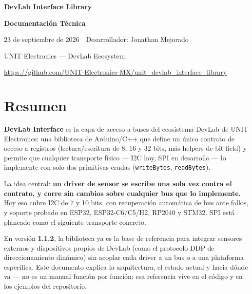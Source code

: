 \documentclass[11pt,a4paper]{article}
\newcommand{\code}[1]{\texttt{\small #1}}
\begin{document}
\begin{titlepage}
    \centering
    \vspace*{5cm}
    {\Huge\bfseries DevLab Interface Library\par}
    \vspace{0.5em}
    {\Large\bfseries Documentación Técnica\par}
    \vspace{2em}
    {\large 23 de septiembre de 2026 \,\textperiodcentered\, Desarrollador: Jonathan Mejorado\par}
    \vfill
    {\normalsize UNIT Electronics --- DevLab Ecosystem\par}
    \vspace{0.6em}
    {\normalsize \url{https://github.com/UNIT-Electronics-MX/unit_devlab_interface_library}\par}
    \vspace{2cm}
\end{titlepage}


\section*{Resumen}

\textbf{DevLab Interface} es la capa de acceso a buses del ecosistema DevLab de UNIT Electronics: una biblioteca de Arduino/C++ que define un único contrato de acceso a registros (lectura/escritura de 8, 16 y 32 bits, más helpers de bit-field) y permite que cualquier transporte físico --- I2C hoy, SPI en desarrollo --- lo implemente con solo dos primitivas crudas (\code{writeBytes}, \code{readBytes}).

La idea central: \textbf{un driver de sensor se escribe una sola vez contra el contrato, y corre sin cambios sobre cualquier bus que lo implemente.} Hoy eso cubre I2C de 7 y 10 bits, con recuperación automática de bus ante fallos, y soporte probado en ESP32, ESP32-C6/C5/H2, RP2040 y STM32. SPI está planeado como el siguiente transporte concreto.

En versión \textbf{1.1.2}, la biblioteca ya es la base de referencia para integrar sensores externos y dispositivos propios de DevLab (como el protocolo DDP de direccionamiento dinámico) sin acoplar cada driver a un bus o a una plataforma específica. Este documento explica la arquitectura, el estado actual y hacia dónde va --- no es un manual función por función; esa referencia vive en el código y en los ejemplos del repositorio.
\end{document}
